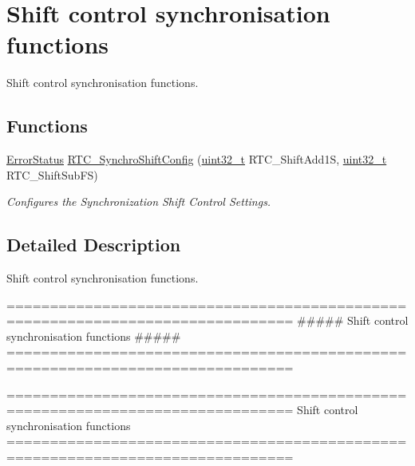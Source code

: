 \hypertarget{group___r_t_c___group12}{\section{Shift control synchronisation functions}
\label{group___r_t_c___group12}
}


Shift control synchronisation functions.  


\subsection*{Functions}
\begin{DoxyCompactItemize}
\item 
\hyperlink{group___exported__types_ga8333b96c67f83cba354b3407fcbb6ee8}{Error\-Status} \hyperlink{group___r_t_c___group12_gaad434ed2a268f05662f0613e8e9717f3}{R\-T\-C\-\_\-\-Synchro\-Shift\-Config} (\hyperlink{stdint_8h_a435d1572bf3f880d55459d9805097f62}{uint32\-\_\-t} R\-T\-C\-\_\-\-Shift\-Add1\-S, \hyperlink{stdint_8h_a435d1572bf3f880d55459d9805097f62}{uint32\-\_\-t} R\-T\-C\-\_\-\-Shift\-Sub\-F\-S)
\begin{DoxyCompactList}\small\item\em Configures the Synchronization Shift Control Settings. \end{DoxyCompactList}\end{DoxyCompactItemize}


\subsection{Detailed Description}
Shift control synchronisation functions. \begin{DoxyVerb} ===============================================================================
              ##### Shift control synchronisation functions #####
 ===============================================================================  \end{DoxyVerb}


\begin{DoxyVerb} ===============================================================================
                   Shift control synchronisation functions
 ===============================================================================  \end{DoxyVerb}
 

